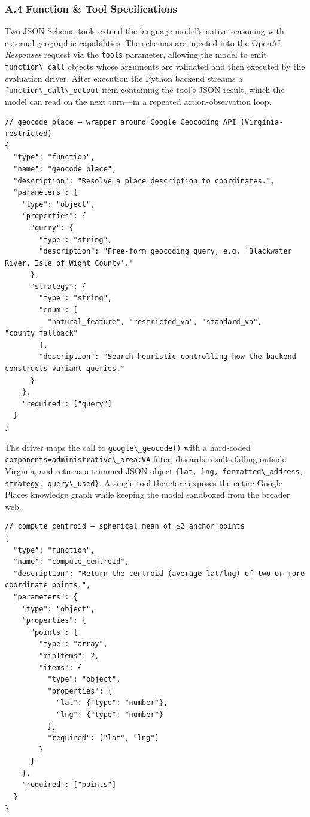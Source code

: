 \documentclass[
  10pt,
  twocolumn]{article}
\begin{document}
\subsubsection{A.4 Function \& Tool
Specifications}\label{a.4-function-tool-specifications}

Two JSON-Schema tools extend the language model's native reasoning with
external geographic capabilities. The schemas are injected into the
OpenAI \emph{Responses} request via the \passthrough{\lstinline!tools!}
parameter, allowing the model to emit
\passthrough{\lstinline!function\_call!} objects whose arguments are
validated and then executed by the evaluation driver. After execution
the Python backend streams a
\passthrough{\lstinline!function\_call\_output!} item containing the
tool's JSON result, which the model can read on the next turn---in a
repeated action-observation loop.

\begin{lstlisting}
// geocode_place – wrapper around Google Geocoding API (Virginia-restricted)
{
  "type": "function",
  "name": "geocode_place",
  "description": "Resolve a place description to coordinates.",
  "parameters": {
    "type": "object",
    "properties": {
      "query": {
        "type": "string",
        "description": "Free-form geocoding query, e.g. 'Blackwater River, Isle of Wight County'."
      },
      "strategy": {
        "type": "string",
        "enum": [
          "natural_feature", "restricted_va", "standard_va", "county_fallback"
        ],
        "description": "Search heuristic controlling how the backend constructs variant queries."
      }
    },
    "required": ["query"]
  }
}
\end{lstlisting}

The driver maps the call to \passthrough{\lstinline!google\_geocode()!}
with a hard-coded
\passthrough{\lstinline!components=administrative\_area:VA!} filter,
discards results falling outside Virginia, and returns a trimmed JSON
object
\passthrough{\lstinline!\{lat, lng, formatted\_address, strategy, query\_used\}!}.
A single tool therefore exposes the entire Google Places knowledge graph
while keeping the model sandboxed from the broader web.

\begin{lstlisting}
// compute_centroid – spherical mean of ≥2 anchor points
{
  "type": "function",
  "name": "compute_centroid",
  "description": "Return the centroid (average lat/lng) of two or more coordinate points.",
  "parameters": {
    "type": "object",
    "properties": {
      "points": {
        "type": "array",
        "minItems": 2,
        "items": {
          "type": "object",
          "properties": {
            "lat": {"type": "number"},
            "lng": {"type": "number"}
          },
          "required": ["lat", "lng"]
        }
      }
    },
    "required": ["points"]
  }
}
\end{lstlisting}
\end{document}
